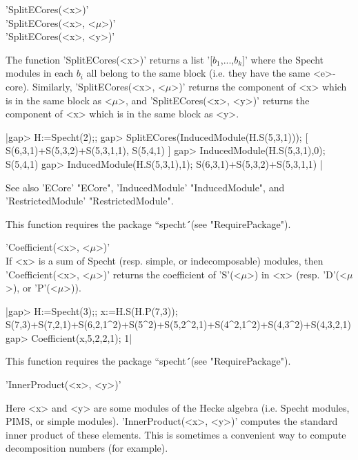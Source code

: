 

'SplitECores(<x>)'\\
'SplitECores(<x>, <$\mu$>)'\\
'SplitECores(<x>, <y>)'

The function 'SplitECores(<x>)' returns a list '[$b_1$,...,$b_k$]' where 
the Specht modules in each $b_i$ all belong to the same block (i.e. they 
have the same <e>-core). Similarly, 'SplitECores(<x>, <$\mu$>)' returns 
the component of <x> which is in the same block as <$\mu$>, and 
'SplitECores(<x>, <y>)' returns the component of <x> which is in the same 
block as <y>.

|gap> H:=Specht(2);;
gap> SplitECores(InducedModule(H.S(5,3,1))); 
[ S(6,3,1)+S(5,3,2)+S(5,3,1,1), S(5,4,1) ]
gap> InducedModule(H.S(5,3,1),0);
S(5,4,1)
gap> InducedModule(H.S(5,3,1),1);
S(6,3,1)+S(5,3,2)+S(5,3,1,1) |

See also 'ECore' "ECore", 'InducedModule' "InducedModule", and 'RestrictedModule' "RestrictedModule".

This function requires the package ``specht\'\'\ (see "RequirePackage").

 

'Coefficient(<x>, <$\mu$>)'\\

If <x> is a sum of Specht (resp. simple, or indecomposable) modules, then
'Coefficient(<x>, <$\mu$>)' returns the coefficient of 'S'(<$\mu$>) in <x>
(resp.  'D'(<$\mu$>), or 'P'(<$\mu$>)).

|gap> H:=Specht(3);; x:=H.S(H.P(7,3));
S(7,3)+S(7,2,1)+S(6,2,1^2)+S(5^2)+S(5,2^2,1)+S(4^2,1^2)+S(4,3^2)+S(4,3,2,1)
gap> Coefficient(x,5,2,2,1);  
1|

This function requires the package ``specht\'\'\ (see "RequirePackage").



'InnerProduct(<x>, <y>)'

Here <x> and <y> are some modules of the Hecke algebra (i.e. Specht 
modules, PIMS, or simple modules). 'InnerProduct(<x>, <y>)' computes the 
standard inner product of these elements. This is sometimes a convenient 
way to compute decomposition numbers (for example).

